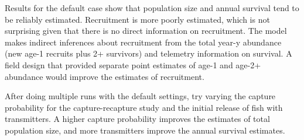 \documentclass[
]{krantz}
\makeatletter
\newenvironment{Shaded}{\begin{snugshade}}{\end{snugshade}}
\newcommand{\AttributeTok}[1]{\textcolor[rgb]{0.27,0.27,0.27}{#1}}
\newcommand{\CommentTok}[1]{\textcolor[rgb]{0.37,0.37,0.37}{\textit{#1}}}
\newcommand{\DecValTok}[1]{\textcolor[rgb]{0.06,0.06,0.06}{#1}}
\newcommand{\FunctionTok}[1]{\textcolor[rgb]{0.27,0.27,0.27}{\textbf{#1}}}
\newcommand{\NormalTok}[1]{#1}
\newcommand{\OtherTok}[1]{\textcolor[rgb]{0.37,0.37,0.37}{#1}}
\newcommand{\SpecialCharTok}[1]{\textcolor[rgb]{0.43,0.43,0.43}{\textbf{#1}}}
\newcommand{\StringTok}[1]{\textcolor[rgb]{0.5,0.5,0.5}{#1}}
\newenvironment{kframe}{%
\medskip{}
\setlength{\fboxsep}{.8em}
 \def\at@end@of@kframe{}%
 \ifinner\ifhmode%
  \def\at@end@of@kframe{\end{minipage}}%
  \begin{minipage}{\columnwidth}%
 \fi\fi%
 \def\FrameCommand##1{\hskip\@totalleftmargin \hskip-\fboxsep
 \colorbox{shadecolor}{##1}\hskip-\fboxsep
     \hskip-\linewidth \hskip-\@totalleftmargin \hskip\columnwidth}%
 \MakeFramed {\advance\hsize-\width
   \@totalleftmargin\z@ \linewidth\hsize
   \@setminipage}}%
 {\par\unskip\endMakeFramed%
 \at@end@of@kframe}
\renewenvironment{Shaded}{\begin{kframe}}{\end{kframe}}
\makeatother
\begin{document}
\begin{Shaded}
\end{Shaded}

Results for the default case show that population size and annual survival tend to be reliably estimated. Recruitment is more poorly estimated, which is not surprising given that there is no direct information on recruitment. The model makes indirect inferences about recruitment from the total year-y abundance (new age-1 recruits plus 2+ survivors) and telemetry information on survival. A field design that provided separate point estimates of age-1 and age-2+ abundance would improve the estimates of recruitment.

After doing multiple runs with the default settings, try varying the capture probability for the capture-recapture study and the initial release of fish with transmitters. A higher capture probability improves the estimates of total population size, and more transmitters improve the annual survival estimates.
\end{document}
